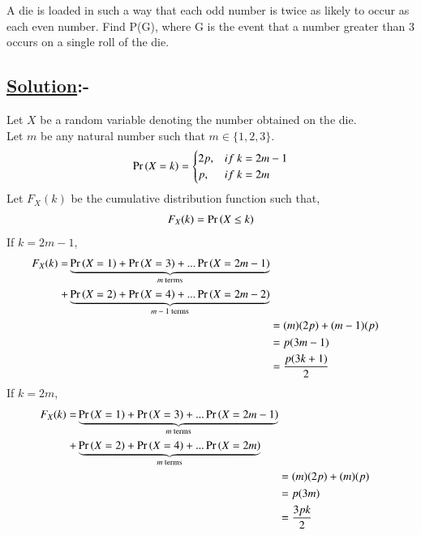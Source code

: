 \documentclass[journal,12pt,twocolumn]{IEEEtran}
\begin{document}
A die is loaded in such a way that each odd number is twice as likely to occur as
each even number. Find P(G), where G is the event that a number greater than
3 occurs on a single roll of the die.

\subsection*{\textbf{\underline{Solution}:-}}

Let $X$ be a random variable denoting the number 
obtained on the die.\\

Let $m$ be any natural number such that $m\in\{1,2,3\}$.\\ 
\begin{align}
\Pr\left(X=k\right)= \begin{cases} 
      2p, & if\ k=2m-1 \\
      p, & if\ k=2m 
   \end{cases}
\end{align}
Let $F_X (k)$ be the cumulative distribution function such that,\\
\begin{align}
    F_X (k) = \Pr\left(X\leq k\right)
\end{align}
If $k = 2m-1$,
\begin{align}
\begin{split}
    F_X (k) = &\underbrace{\Pr\left(X=1\right) + \Pr\left(X=3\right) + ... \Pr\left(X=2m-1\right)}_{\text{$m$ terms}}\\
    +&\underbrace{\Pr\left(X=2\right) + \Pr\left(X=4\right) + ... \Pr\left(X=2m-2\right)}_{\text{$m-1$ terms}}
\end{split}
\\
    &= (m)(2p) + (m-1)(p)\\
    &= p(3m-1)\\
    &= \frac{p(3k+1)}{2}
\end{align}
If $k = 2m$,
\begin{align}
\begin{split}
    F_X (k) = &\underbrace{\Pr\left(X=1\right) + \Pr\left(X=3\right) + ... \Pr\left(X=2m-1\right)}_{\text{$m$ terms}}\\
    +&\underbrace{\Pr\left(X=2\right) + \Pr\left(X=4\right) + ... \Pr\left(X=2m\right)}_{\text{$m$ terms}}
\end{split}
\\
    &= (m)(2p) + (m)(p)\\
    &= p(3m)\\
    &= \frac{3pk}{2}
\end{align}
\end{document}

